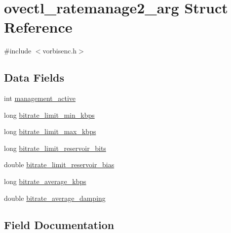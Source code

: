 \hypertarget{structovectl__ratemanage2__arg}{}\section{ovectl\+\_\+ratemanage2\+\_\+arg Struct Reference}
\label{structovectl__ratemanage2__arg}


{\ttfamily \#include $<$vorbisenc.\+h$>$}

\subsection*{Data Fields}
\begin{DoxyCompactItemize}
\item 
int \hyperlink{structovectl__ratemanage2__arg_aca1f656373a1597177dac924578e375b}{management\+\_\+active}
\item 
long \hyperlink{structovectl__ratemanage2__arg_aeb53a17fff14ec50d143602adfdeabeb}{bitrate\+\_\+limit\+\_\+min\+\_\+kbps}
\item 
long \hyperlink{structovectl__ratemanage2__arg_a175691482003edd7d94592fa2bc993a9}{bitrate\+\_\+limit\+\_\+max\+\_\+kbps}
\item 
long \hyperlink{structovectl__ratemanage2__arg_a75e496acac882e156137de9d1200ebd7}{bitrate\+\_\+limit\+\_\+reservoir\+\_\+bits}
\item 
double \hyperlink{structovectl__ratemanage2__arg_a5567fde1798b1e80e40a77565b4b44f4}{bitrate\+\_\+limit\+\_\+reservoir\+\_\+bias}
\item 
long \hyperlink{structovectl__ratemanage2__arg_a1f6bab60d87143d5060dd6c59aad6e71}{bitrate\+\_\+average\+\_\+kbps}
\item 
double \hyperlink{structovectl__ratemanage2__arg_a1069e148a884d8706928cd2e39870720}{bitrate\+\_\+average\+\_\+damping}
\end{DoxyCompactItemize}


\subsection{Field Documentation}
\mbox{\label{structovectl__ratemanage2__arg_a1069e148a884d8706928cd2e39870720}} 
